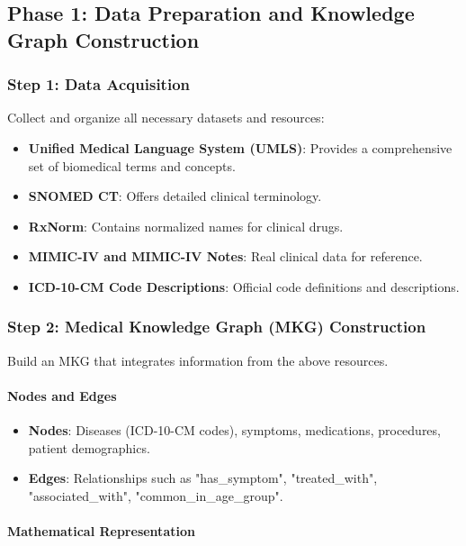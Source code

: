 \documentclass[12pt, a4paper]{article}
\begin{document}
\subsection{Phase 1: Data Preparation and Knowledge Graph Construction}

\subsubsection{Step 1: Data Acquisition}

Collect and organize all necessary datasets and resources:

\begin{itemize}
    \item \textbf{Unified Medical Language System (UMLS)}: Provides a comprehensive set of biomedical terms and concepts.
    \item \textbf{SNOMED CT}: Offers detailed clinical terminology.
    \item \textbf{RxNorm}: Contains normalized names for clinical drugs.
    \item \textbf{MIMIC-IV and MIMIC-IV Notes}: Real clinical data for reference.
    \item \textbf{ICD-10-CM Code Descriptions}: Official code definitions and descriptions.
\end{itemize}

\subsubsection{Step 2: Medical Knowledge Graph (MKG) Construction}

Build an MKG that integrates information from the above resources.

\paragraph{Nodes and Edges}

\begin{itemize}
    \item \textbf{Nodes}: Diseases (ICD-10-CM codes), symptoms, medications, procedures, patient demographics.
    \item \textbf{Edges}: Relationships such as "has\_symptom", "treated\_with", "associated\_with", "common\_in\_age\_group".
\end{itemize}

\paragraph{Mathematical Representation}
\end{document}
